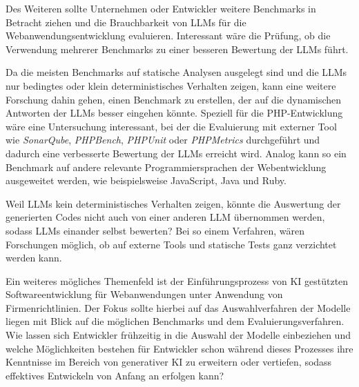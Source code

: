 Des Weiteren sollte Unternehmen oder Entwickler weitere Benchmarks in Betracht ziehen und die Brauchbarkeit von LLMs für die Webanwendungsentwicklung evaluieren. Interessant wäre die Prüfung, ob die Verwendung mehrerer Benchmarks zu einer besseren Bewertung der LLMs führt.\vspace{0.2cm}

Da die meisten Benchmarks auf statische Analysen ausgelegt sind und die LLMs nur bedingtes oder klein deterministisches Verhalten zeigen, kann eine weitere Forschung dahin gehen, einen Benchmark zu erstellen, der auf die dynamischen Antworten der LLMs besser eingehen könnte. Speziell für die PHP-Entwicklung wäre eine Untersuchung interessant, bei der die Evaluierung mit externer Tool wie \textit{SonarQube}, \textit{PHPBench}, \textit{PHPUnit} oder \textit{PHPMetrics} durchgeführt und dadurch eine verbesserte Bewertung der LLMs erreicht wird. Analog kann so ein Benchmark auf andere relevante Programmiersprachen der Webentwicklung ausgeweitet werden, wie beispielsweise JavaScript, Java und Ruby.\vspace{0.2cm}

Weil LLMs kein deterministisches Verhalten zeigen, könnte die Auswertung der generierten Codes nicht auch von einer anderen LLM übernommen werden, sodass LLMs einander selbst bewerten? Bei so einem Verfahren, wären Forschungen möglich, ob auf externe Tools und statische Tests ganz verzichtet werden kann.\vspace{0.2cm}

Ein weiteres mögliches Themenfeld ist der Einführungsprozess von KI gestützten Softwareentwicklung für Webanwendungen unter Anwendung von Firmenrichtlinien. Der Fokus sollte hierbei auf das Auswahlverfahren der Modelle liegen mit Blick auf die möglichen Benchmarks und dem Evaluierungsverfahren. Wie lassen sich Entwickler frühzeitig in die Auswahl der Modelle einbeziehen und welche Möglichkeiten bestehen für Entwickler schon während dieses Prozesses ihre Kenntnisse im Bereich von generativer KI zu erweitern oder vertiefen, sodass effektives Entwickeln von Anfang an erfolgen kann?\vspace{0.2cm}

